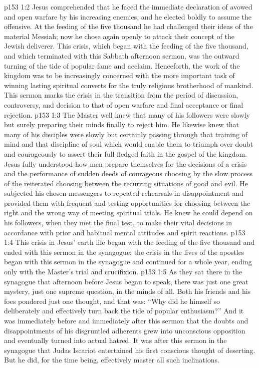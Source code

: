 \vs p153 1:2 Jesus comprehended that he faced the immediate declaration of avowed and open warfare by his increasing enemies, and he elected boldly to assume the offensive. At the feeding of the five thousand he had challenged their ideas of the material Messiah; now he chose again openly to attack their concept of the Jewish deliverer. This crisis, which began with the feeding of the five thousand, and which terminated with this Sabbath afternoon sermon, was the outward turning of the tide of popular fame and acclaim. Henceforth, the work of the kingdom was to be increasingly concerned with the more important task of winning lasting spiritual converts for the truly religious brotherhood of mankind. This sermon marks the crisis in the transition from the period of discussion, controversy, and decision to that of open warfare and final acceptance or final rejection.
\vs p153 1:3 The Master well knew that many of his followers were slowly but surely preparing their minds finally to reject him. He likewise knew that many of his disciples were slowly but certainly passing through that training of mind and that discipline of soul which would enable them to triumph over doubt and courageously to assert their full\hyp{}fledged faith in the gospel of the kingdom. Jesus fully understood how men prepare themselves for the decisions of a crisis and the performance of sudden deeds of courageous choosing by the slow process of the reiterated choosing between the recurring situations of good and evil. He subjected his chosen messengers to repeated rehearsals in disappointment and provided them with frequent and testing opportunities for choosing between the right and the wrong way of meeting spiritual trials. He knew he could depend on his followers, when they met the final test, to make their vital decisions in accordance with prior and habitual mental attitudes and spirit reactions.
\pc \vs p153 1:4 This crisis in Jesus’ earth life began with the feeding of the five thousand and ended with this sermon in the synagogue; the crisis in the lives of the apostles began with this sermon in the synagogue and continued for a whole year, ending only with the Master’s trial and crucifixion.
\pc \vs p153 1:5 As they sat there in the synagogue that afternoon before Jesus began to speak, there was just one great mystery, just one supreme question, in the minds of all. Both his friends and his foes pondered just one thought, and that was: “Why did he himself so deliberately and effectively turn back the tide of popular enthusiasm?” And it was immediately before and immediately after this sermon that the doubts and disappointments of his disgruntled adherents grew into unconscious opposition and eventually turned into actual hatred. It was after this sermon in the synagogue that Judas Iscariot entertained his first conscious thought of deserting. But he did, for the time being, effectively master all such inclinations.\plusone

